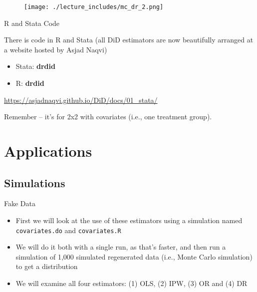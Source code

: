 \documentclass{beamer}
\begin{document}
\begin{frame}[plain]
	\begin{figure}
	\texttt{[image: ./lecture\_includes/mc\_dr\_2.png]}
	\end{figure}


\end{frame}


\begin{frame}{R and Stata Code}

There is code in R and Stata (all DiD estimators are now beautifully arranged at a website hosted by Asjad Naqvi)
\begin{itemize}
\item Stata: \textbf{drdid}
\item R: \textbf{drdid}
\end{itemize}

\bigskip

\url{https://asjadnaqvi.github.io/DiD/docs/01_stata/}

\bigskip

Remember -- it's for 2x2 with covariates (i.e., one treatment group). 

\end{frame}

\section{Applications}

\subsection{Simulations}

\begin{frame}{Fake Data}

\begin{itemize}

\item First we will look at the use of these estimators using a simulation named \texttt{covariates.do} and \texttt{covariates.R}

\item We will do it both with a single run, as that's faster, and then run a simulation of 1,000 simulated regenerated data (i.e., Monte Carlo simulation) to get a distribution

\item We will examine all four estimators: (1) OLS, (2) IPW, (3) OR and (4) DR

\end{itemize}

\end{frame}
\end{document}
